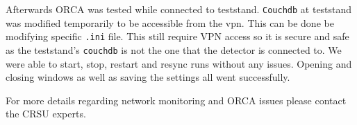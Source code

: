 \documentclass[a4paper,10pt]{article}
\begin{document}
Afterwards ORCA was tested while connected to teststand. {\tt Couchdb} at teststand was modified temporarily to be accessible from the vpn. This can be done be modifying specific {\tt .ini} file. This still require VPN access so it is secure and safe as the teststand's {\tt couchdb} is not the one that the detector is connected to. We were able to start, stop, restart and resync runs without any issues. Opening and closing windows as well as saving the settings all went successfully.

For more details regarding network monitoring and ORCA issues please contact the CRSU experts.

\end{document}
